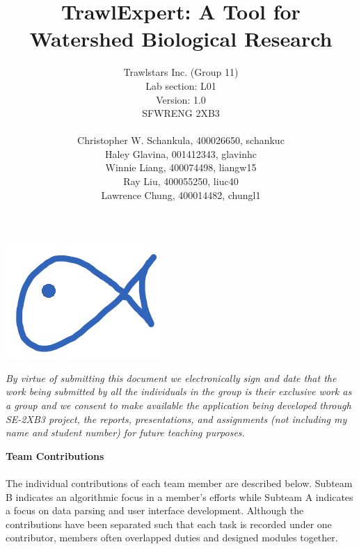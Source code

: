 \documentclass{article}
\begin{document}
\title{\textbf{TrawlExpert: A Tool for Watershed Biological Research}}
\author{Trawlstars Inc. (Group 11) \\ Lab section: L01  \\ Version: 1.0 \\ SFWRENG 2XB3 \\ \\ Christopher W. Schankula, 400026650, schankuc \\ Haley Glavina, 001412343, glavinhc \\ Winnie Liang, 400074498, liangw15 \\ Ray Liu, 400055250, liuc40 \\ Lawrence Chung, 400014482, chungl1}


\maketitle

\begin{center}
\includegraphics{logo.png}
\end{center}

\newpage

\begin{versionhistory}
\end{versionhistory} 

\noindent\textit{By virtue of submitting this document we electronically sign and date that the work being submitted by all the individuals in the group is their exclusive work as a group and we consent to make available the application being developed through SE-2XB3 project, the reports, presentations, and assignments (not including my name and student number) for future teaching purposes.}

\newpage

\textbf{\Large{Team Contributions}}\\ \\
The individual contributions of each team member are described below. Subteam B indicates an algorithmic focus in a member's efforts while Subteam A indicates a focus on data parsing and user interface development. Although the contributions have been separated such that each task is recorded under one contributor, members often overlapped duties and designed modules together. \\
\end{document}
